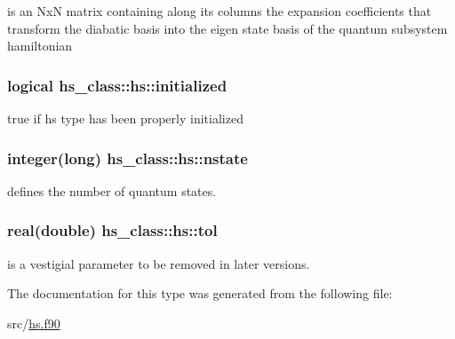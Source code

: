 is an Nx\+N matrix containing along its columns the expansion coefficients that transform the diabatic basis into the eigen state basis of the quantum subsystem hamiltonian 

\hypertarget{strucths__class_1_1hs_a39ff1ef8fc5a20f97973d4947d518c5f}{
\subsubsection[{initialized}]{\setlength{\rightskip}{0pt plus 5cm}logical hs\+\_\+class\+::hs\+::initialized\hspace{0.3cm}{\ttfamily [private]}}}\label{strucths__class_1_1hs_a39ff1ef8fc5a20f97973d4947d518c5f}


true if hs type has been properly initialized 

\hypertarget{strucths__class_1_1hs_acb57246378a120bd330012dae9a3ff38}{
\subsubsection[{nstate}]{\setlength{\rightskip}{0pt plus 5cm}integer(long) hs\+\_\+class\+::hs\+::nstate\hspace{0.3cm}{\ttfamily [private]}}}\label{strucths__class_1_1hs_acb57246378a120bd330012dae9a3ff38}


defines the number of quantum states. 

\hypertarget{strucths__class_1_1hs_a45c5cb902e23547a231a25fcd34cc621}{
\subsubsection[{tol}]{\setlength{\rightskip}{0pt plus 5cm}real(double) hs\+\_\+class\+::hs\+::tol\hspace{0.3cm}{\ttfamily [private]}}}\label{strucths__class_1_1hs_a45c5cb902e23547a231a25fcd34cc621}


is a vestigial parameter to be removed in later versions. 



The documentation for this type was generated from the following file\+:\begin{DoxyCompactItemize}
\item 
src/\hyperlink{hs_8f90}{hs.\+f90}\end{DoxyCompactItemize}
